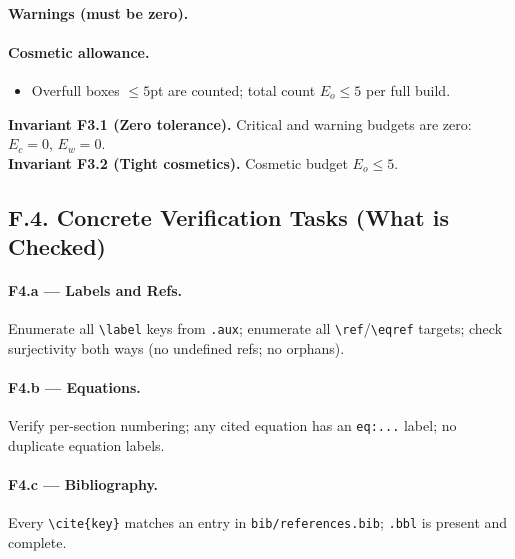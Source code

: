 \paragraph{Warnings (must be zero).}

\paragraph{Cosmetic allowance.}
\begin{itemize}
  \item Overfull boxes $\le 5$pt are counted; total count $E_o \le 5$ per full build.
\end{itemize}

\noindent\textbf{Invariant F3.1 (Zero tolerance).} Critical and warning budgets are zero: $E_c=0$, $E_w=0$.\\
\textbf{Invariant F3.2 (Tight cosmetics).} Cosmetic budget $E_o\le 5$.


\subsection*{F.4. Concrete Verification Tasks (What is Checked)}

\paragraph{F4.a — Labels and Refs.} 
Enumerate all \verb|\label| keys from \texttt{.aux}; enumerate all \verb|\ref|/\verb|\eqref| targets; 
check surjectivity both ways (no undefined refs; no orphans).

\paragraph{F4.b — Equations.}
Verify per-section numbering; any cited equation has an \texttt{eq:...} label; no duplicate equation labels.

\paragraph{F4.c — Bibliography.}
Every \verb|\cite{key}| matches an entry in \texttt{bib/references.bib}; \texttt{.bbl} is present and complete.

